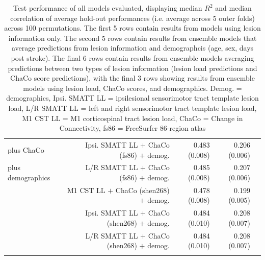 \documentclass[10pt]{article}
\def\Plus{\texttt{+}}
\begin{document}
\begin{table}[h]
\begin{tabular}{lrrrr}
 plus ChaCo & Ipsi. SMATT LL $\Plus$ ChaCo  (fs86) $\Plus$ demog. & 0.483 (0.008) & 0.206 (0.006) \\
 plus demographics & L/R SMATT LL $\Plus$ ChaCo  (fs86) $\Plus$ demog. & 0.485 (0.008) & 0.207 (0.006) \\
 & M1 CST LL $\Plus$ ChaCo  (shen268) $\Plus$ demog. & 0.478 (0.008) & 0.199 (0.005) \\
 & Ipsi. SMATT LL $\Plus$ ChaCo  (shen268) $\Plus$ demog. & 0.484 (0.010) & 0.208 (0.007) \\
 & L/R SMATT LL $\Plus$ ChaCo  (shen268) $\Plus$ demog. & 0.484 (0.010) & 0.208 (0.007) \\
 \arrayrulecolor{black}\bottomrule
\end{tabular}

\caption{Test performance of all models evaluated, displaying median $R^2$ and median correlation of average hold-out performances (i.e. average across 5 outer folds) across 100 permutations. The first 5 rows contain results from models using lesion information only. The second 5 rows contain results from ensemble models that average predictions from lesion information and demographcis (age, sex, days post stroke). The final 6 rows contain results from ensemble models averaging predictions between two types of lesion information (lesion load predictions and ChaCo score predictions), with the final 3 rows showing results from ensemble models using lesion load, ChaCo scores, and demographics. Demog. = demographics, Ipsi. SMATT LL = ipsilesional sensorimotor tract template lesion load, L/R SMATT LL = left and right sensorimotor tract template lesion load, M1 CST LL = M1 corticospinal tract lesion load, ChaCo = Change in Connectivity, fs86 = FreeSurfer 86-region atlas}
\end{table}
\end{document}
